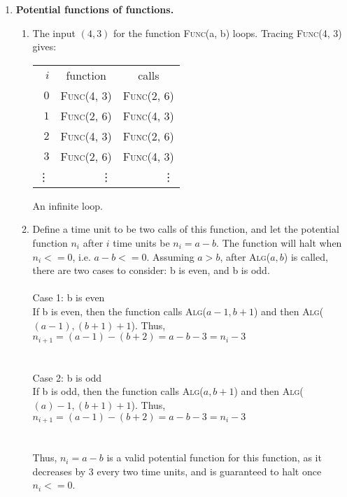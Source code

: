 \documentclass{article}
\begin{document}
\begin{enumerate}
    \item \textbf{Potential functions of functions.}
    \begin{enumerate}
        \item The input $(4, 3)$ for the function \textsc{Func}(a, b) loops. Tracing \textsc{Func}(4, 3) gives: \\
        \begin{table}[H]\centering
            \begin{tabular}{r|r|r}
                $i$ & \multicolumn{1}{c|}{function} & \multicolumn{1}{|c}{calls} \\
                $0$ & \textsc{Func}(4, 3) & \textsc{Func}(2, 6)\\
                $1$ & \textsc{Func}(2, 6) & \textsc{Func}(4, 3)\\
                $2$ & \textsc{Func}(4, 3) & \textsc{Func}(2, 6)\\
                $3$ & \textsc{Func}(2, 6) & \textsc{Func}(4, 3)\\
                \vdots & \vdots & \vdots
            \end{tabular}
        \end{table}
        An infinite loop.
        
        \item Define a time unit to be two calls of this function, and let the potential function $n_i$ after $i$ time units be $n_i = a - b$. The function will halt when $n_i <= 0$, i.e. $a - b <= 0$. Assuming $a > b$, after \textsc{Alg}($a, b$) is called, there are two cases to consider: b is even, and b is odd.
        \\\\
        Case 1: b is even \\
        If b is even, then the function calls \textsc{Alg}($a-1, b+1$) and then \textsc{Alg}($(a-1), (b+1)+1$). Thus, \\
        $n_{i+1} = (a-1) - (b+2) = a - b - 3 = n_i - 3$ \\
        \\\\
        Case 2: b is odd \\
        If b is odd, then the function calls \textsc{Alg}($a, b+1$) and then \textsc{Alg}($(a)-1, (b+1)+1$). Thus, \\
        $n_{i+1} = (a-1) - (b+2) = a - b - 3 = n_i - 3$ \\
        \\\\
        Thus, $n_i = a - b$ is a valid potential function for this function, as it decreases by 3 every two time units, and is guaranteed to halt once $n_i <= 0$.


\end{enumerate}
\end{enumerate}
\end{document}
